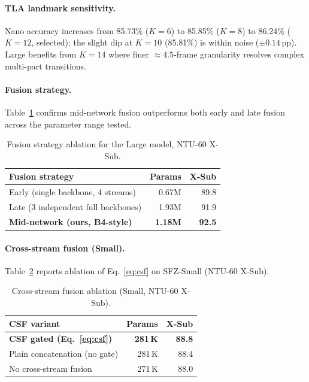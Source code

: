 \documentclass[sigconf,screen,review,anonymous]{acmart}
\newcommand{\best}[1]{{\color{bestcol}\textbf{#1}}}
\begin{document}
\paragraph{TLA landmark sensitivity.}
Nano accuracy increases from 85.73\% ($K{=}6$) to 85.85\% ($K{=}8$) to
86.24\% ($K{=}12$, selected); the slight dip at $K{=}10$ (85.81\%) is
within noise (${\pm}0.14$\,pp). Large benefits from $K{=}14$ where
finer ${\approx}4.5$-frame granularity resolves complex multi-part transitions.

\paragraph{Fusion strategy.}
Table~\ref{tab:fusion} confirms mid-network fusion outperforms both early
and late fusion across the parameter range tested.

\begin{table}[t]
\centering
\caption{Fusion strategy ablation for the Large model, NTU-60 X-Sub.}
\label{tab:fusion}
\setlength{\tabcolsep}{6pt}
\begin{tabular}{lrr}
\toprule
Fusion strategy & Params & X-Sub \\
\midrule
Early (single backbone, 4 streams) & 0.67M & 89.8 \\
Late  (3 independent full backbones) & 1.93M & 91.9 \\
\textbf{Mid-network (ours, B4-style)} & \textbf{1.18M} & \best{92.5} \\
\bottomrule
\end{tabular}
\vspace{-3mm}\end{table}

\paragraph{Cross-stream fusion (Small).}
Table~\ref{tab:csf} reports ablation of Eq.~\ref{eq:csf} on SFZ-Small (NTU-60 X-Sub).

\begin{table}[t]
\centering
\caption{Cross-stream fusion ablation (Small, NTU-60 X-Sub).}
\label{tab:csf}
\setlength{\tabcolsep}{6pt}
\begin{tabular}{lrr}
\toprule
CSF variant & Params & X-Sub \\
\midrule
\textbf{CSF gated (Eq.~\ref{eq:csf})} & \textbf{281\,K} & \best{88.8} \\
Plain concatenation (no gate) & 281\,K & 88.4 \\
No cross-stream fusion        & 271\,K & 88.0 \\
\bottomrule
\end{tabular}
\vspace{-3mm}\end{table}
\end{document}
